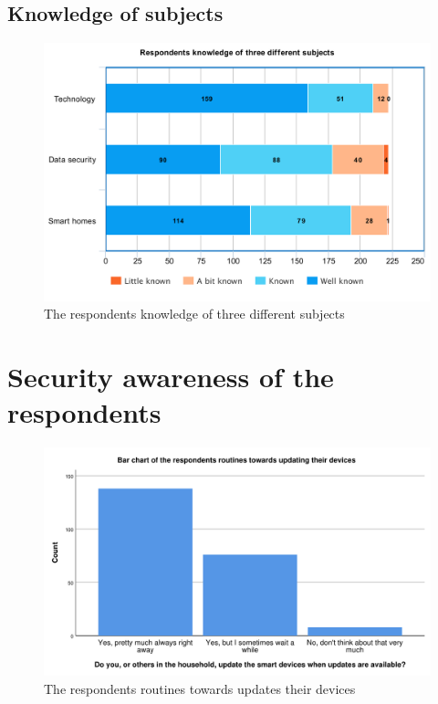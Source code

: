 \subsection{Knowledge of subjects}

\begin{figure}[H]
    \centering
    \includegraphics[scale=0.3]{figures/diagrams/knowledge.pdf}
    \caption{The respondents knowledge of three different subjects}
    \label{fig:knowledge}
\end{figure}


\section{Security awareness of the respondents}

\begin{figure}[H]
    \centering
    \includegraphics[scale=0.55]{figures/diagrams/update.pdf}
    \caption{The respondents routines towards updates their devices}
    \label{fig:update}
\end{figure}

